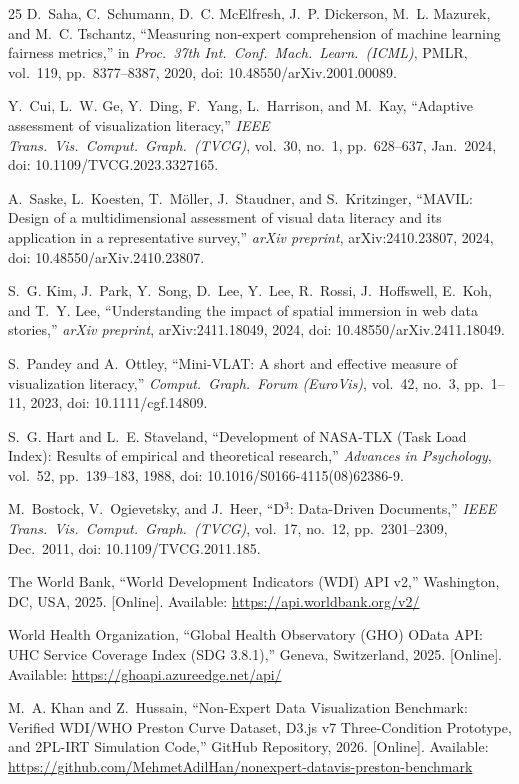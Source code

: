 \documentclass[conference]{IEEEtran}
\begin{document}
\begin{thebibliography}{25}
D.~Saha, C.~Schumann, D.~C. McElfresh, J.~P. Dickerson, M.~L. Mazurek, and M.~C. Tschantz, ``Measuring non-expert comprehension of machine learning fairness metrics,'' in \textit{Proc.\ 37th Int.\ Conf.\ Mach.\ Learn.\ (ICML)}, PMLR, vol.~119, pp.~8377--8387, 2020, doi: 10.48550/arXiv.2001.00089.

Y.~Cui, L.~W. Ge, Y.~Ding, F.~Yang, L.~Harrison, and M.~Kay, ``Adaptive assessment of visualization literacy,'' \textit{IEEE Trans.\ Vis.\ Comput.\ Graph.\ (TVCG)}, vol.~30, no.~1, pp.~628--637, Jan.\ 2024, doi: 10.1109/TVCG.2023.3327165.

A.~Saske, L.~Koesten, T.~M\"oller, J.~Staudner, and S.~Kritzinger, ``MAVIL: Design of a multidimensional assessment of visual data literacy and its application in a representative survey,'' \textit{arXiv preprint}, arXiv:2410.23807, 2024, doi: 10.48550/arXiv.2410.23807.

S.~G. Kim, J.~Park, Y.~Song, D.~Lee, Y.~Lee, R.~Rossi, J.~Hoffswell, E.~Koh, and T.~Y. Lee, ``Understanding the impact of spatial immersion in web data stories,'' \textit{arXiv preprint}, arXiv:2411.18049, 2024, doi: 10.48550/arXiv.2411.18049.

S.~Pandey and A.~Ottley, ``Mini-VLAT: A short and effective measure of visualization literacy,'' \textit{Comput.\ Graph.\ Forum (EuroVis)}, vol.~42, no.~3, pp.~1--11, 2023, doi: 10.1111/cgf.14809.

S.~G. Hart and L.~E. Staveland, ``Development of NASA-TLX (Task Load Index): Results of empirical and theoretical research,'' \textit{Advances in Psychology}, vol.~52, pp.~139--183, 1988, doi: 10.1016/S0166-4115(08)62386-9.

M.~Bostock, V.~Ogievetsky, and J.~Heer, ``D$^3$: Data-Driven Documents,'' \textit{IEEE Trans.\ Vis.\ Comput.\ Graph.\ (TVCG)}, vol.~17, no.~12, pp.~2301--2309, Dec.\ 2011, doi: 10.1109/TVCG.2011.185.

The World Bank, ``World Development Indicators (WDI) API v2,'' Washington, DC, USA, 2025. [Online]. Available: \url{https://api.worldbank.org/v2/}

World Health Organization, ``Global Health Observatory (GHO) OData API: UHC Service Coverage Index (SDG 3.8.1),'' Geneva, Switzerland, 2025. [Online]. Available: \url{https://ghoapi.azureedge.net/api/}

M.~A. Khan and Z.~Hussain, ``Non-Expert Data Visualization Benchmark: Verified WDI/WHO Preston Curve Dataset, D3.js v7 Three-Condition Prototype, and 2PL-IRT Simulation Code,'' GitHub Repository, 2026. [Online]. Available: \url{https://github.com/MehmetAdilHan/nonexpert-datavis-preston-benchmark}

\end{thebibliography}
\end{document}
